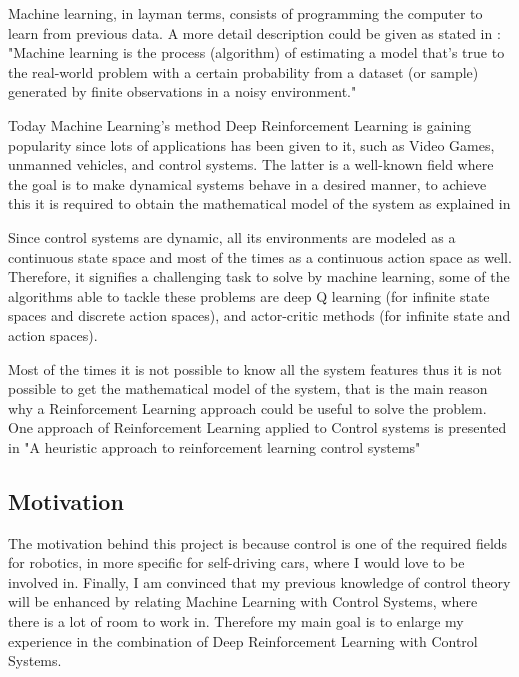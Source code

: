 Machine learning, in layman terms, consists of programming the computer to learn from previous data. A more detail description could be given as stated in \cite{MLState}: "Machine learning is the process (algorithm) of estimating a model that’s true to the real-world problem with a certain probability
from a dataset (or sample) generated by finite observations in a noisy environment."

Today Machine Learning's method Deep Reinforcement Learning is gaining popularity since lots of applications has been given to it, such as Video Games, unmanned vehicles, and control systems. The latter is a well-known field where the goal is to make dynamical systems behave in a desired manner, to achieve this it is required to obtain the mathematical model of the system as explained in \cite{Control}

Since control systems are dynamic, all its environments are modeled as a continuous state space and most of the times as a continuous action space as well. Therefore, it signifies a challenging task to solve by machine learning, some of the algorithms able to tackle these problems are deep Q learning (for infinite state spaces and discrete action spaces), and actor-critic methods (for infinite state and action spaces). 

Most of the times it is not possible to know all the system features thus it is not possible to get the mathematical model of the system, that is the main reason why a Reinforcement Learning approach could be useful to solve the problem. One approach of Reinforcement Learning applied to Control systems is presented in "A heuristic approach to reinforcement learning control systems" \cite{1098193}

\subsection{Motivation}
The motivation behind this project is because control is one of the required fields for robotics, in more specific for self-driving cars, where I would love to be involved in. Finally, I am convinced that my previous knowledge of control theory will be enhanced by relating Machine Learning with Control Systems, where there is a lot of room to work in. Therefore my main goal is to enlarge my experience in the combination of Deep Reinforcement Learning with Control Systems.